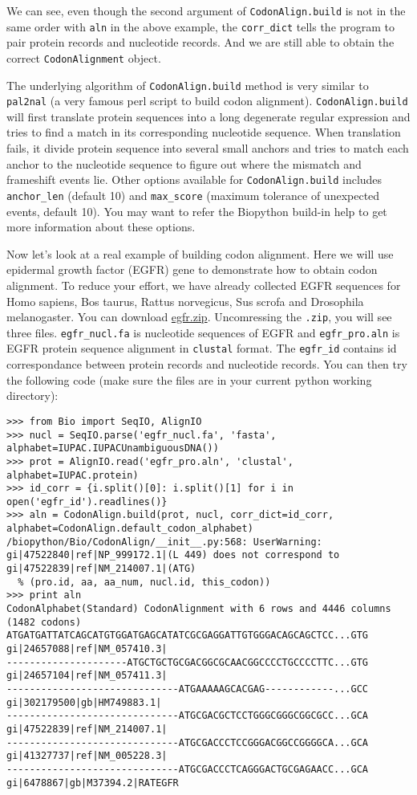 \documentclass{article}
\begin{document}
We can see, even though the second argument of \texttt{CodonAlign.build}
is not in the same order with \texttt{aln} in the above example, the
\texttt{corr\_dict} tells the program to pair protein records and
nucleotide records. And we are still able to obtain the correct
\texttt{CodonAlignment} object.

The underlying algorithm of \texttt{CodonAlign.build} method is very
similar to \texttt{pal2nal} (a very famous perl script to build codon
alignment). \texttt{CodonAlign.build} will first translate protein
sequences into a long degenerate regular expression and tries to find a
match in its corresponding nucleotide sequence. When translation fails,
it divide protein sequence into several small anchors and tries to match
each anchor to the nucleotide sequence to figure out where the mismatch
and frameshift events lie. Other options available for
\texttt{CodonAlign.build} includes \texttt{anchor\_len} (default 10) and
\texttt{max\_score} (maximum tolerance of unexpected events, default
10). You may want to refer the Biopython build-in help to get more
information about these options.

Now let's look at a real example of building codon alignment. Here we
will use epidermal growth factor (EGFR) gene to demonstrate how to
obtain codon alignment. To reduce your effort, we have already collected
EGFR sequences for Homo sapiens, Bos taurus, Rattus norvegicus,
Sus scrofa and Drosophila melanogaster. You can download
\href{http://zruanweb.com/egfr.zip}{egfr.zip}. Uncomressing the
\texttt{.zip}, you will see three files. \texttt{egfr\_nucl.fa} is
nucleotide sequences of EGFR and \texttt{egfr\_pro.aln} is EGFR protein
sequence alignment in \texttt{clustal} format. The \texttt{egfr\_id}
contains id correspondance between protein records and nucleotide
records. You can then try the following code (make sure the files are in
your current python working directory):

\begin{verbatim}
>>> from Bio import SeqIO, AlignIO
>>> nucl = SeqIO.parse('egfr_nucl.fa', 'fasta', alphabet=IUPAC.IUPACUnambiguousDNA())
>>> prot = AlignIO.read('egfr_pro.aln', 'clustal', alphabet=IUPAC.protein)
>>> id_corr = {i.split()[0]: i.split()[1] for i in open('egfr_id').readlines()}
>>> aln = CodonAlign.build(prot, nucl, corr_dict=id_corr, alphabet=CodonAlign.default_codon_alphabet)
/biopython/Bio/CodonAlign/__init__.py:568: UserWarning: gi|47522840|ref|NP_999172.1|(L 449) does not correspond to gi|47522839|ref|NM_214007.1|(ATG)
  % (pro.id, aa, aa_num, nucl.id, this_codon))
>>> print aln
CodonAlphabet(Standard) CodonAlignment with 6 rows and 4446 columns (1482 codons)
ATGATGATTATCAGCATGTGGATGAGCATATCGCGAGGATTGTGGGACAGCAGCTCC...GTG gi|24657088|ref|NM_057410.3|
---------------------ATGCTGCTGCGACGGCGCAACGGCCCCTGCCCCTTC...GTG gi|24657104|ref|NM_057411.3|
------------------------------ATGAAAAAGCACGAG------------...GCC gi|302179500|gb|HM749883.1|
------------------------------ATGCGACGCTCCTGGGCGGGCGGCGCC...GCA gi|47522839|ref|NM_214007.1|
------------------------------ATGCGACCCTCCGGGACGGCCGGGGCA...GCA gi|41327737|ref|NM_005228.3|
------------------------------ATGCGACCCTCAGGGACTGCGAGAACC...GCA gi|6478867|gb|M37394.2|RATEGFR
\end{verbatim}
\end{document}
